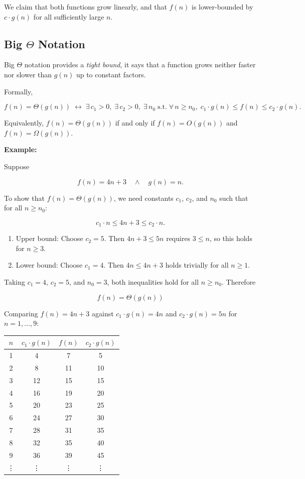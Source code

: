 \documentclass[12pt,a4paper,openany]{article}
\begin{document}
We claim that both functions grow linearly, and that $f(n)$ is lower-bounded by $c \cdot g(n)$ for all sufficiently large $n$.

\subsection{Big $\Theta$ Notation}

Big $\Theta$ notation provides a \emph{tight bound}, it says that a function grows neither faster nor slower than $g(n)$ up to constant factors.

Formally,

\[
f(n) = \Theta(g(n))
\;\leftrightarrow\;
\exists\, c_1 > 0,\; \exists\, c_2 > 0,\; \exists\, n_0
\;\text{s.t.}\;
\forall\, n \ge n_0,\;
c_1 \cdot g(n) \le f(n) \le c_2 \cdot g(n).
\]

Equivalently, $f(n) = \Theta(g(n))$ if and only if $f(n) = O(g(n))$ and $f(n) = \Omega(g(n))$.

\textbf{Example:}

Suppose

\[
f(n) = 4n + 3 \quad \land \quad g(n) = n.
\]

To show that \( f(n) = \Theta(g(n)) \), we need constants \( c_1 \), \( c_2 \), and \( n_0 \) such that for all \( n \ge n_0 \):

\[
c_1 \cdot n \le 4n + 3 \le c_2 \cdot n.
\]

\begin{enumerate}
\item Upper bound: Choose $c_2 = 5$. Then $4n + 3 \le 5n$ requires $3 \le n$, so this holds for $n \ge 3$.
\item Lower bound: Choose $c_1 = 4$. Then $4n \le 4n + 3$ holds trivially for all $n \ge 1$.
\end{enumerate}
Taking $c_1 = 4$, $c_2 = 5$, and $n_0 = 3$, both inequalities hold for all $n \ge n_0$. Therefore

\[\boxed{f(n) = \Theta(g(n))}\]

Comparing $f(n) = 4n+3$ against $c_1 \cdot g(n) = 4n$ and $c_2 \cdot g(n) = 5n$ for $n = 1,\ldots,9$:

\begin{table}[h]
\centering
\begin{tabular}{|c|c|c|c|}
\hline
\textbf{$n$} & \textbf{$c_1 \cdot g(n)$} & \textbf{$f(n)$} & \textbf{$c_2 \cdot g(n)$} \\
\hline
1 & 4  & 7  & 5  \\
2 & 8  & 11 & 10 \\
3 & 12 & 15 & 15 \\
4 & 16 & 19 & 20 \\
5 & 20 & 23 & 25 \\
6 & 24 & 27 & 30 \\
7 & 28 & 31 & 35 \\
8 & 32 & 35 & 40 \\
9 & 36 & 39 & 45 \\
\vdots & \vdots & \vdots & \vdots \\
\hline
\end{tabular}
\end{table}
\end{document}
